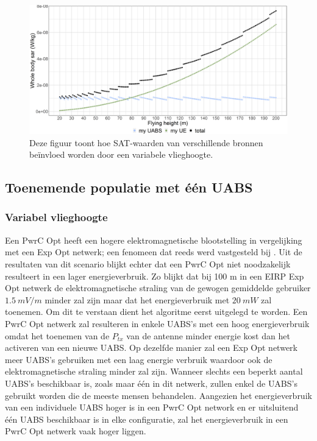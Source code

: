 \documentclass[twocolumn]{phdsymp_dutch}
\begin{document}
\begin{figure}[h!]
\centering
  \includegraphics[width=\linewidth]{s1/fhvssar.png}
  \caption{
    Deze figuur toont hoe SAT-waarden van verschillende bronnen be\"invloed worden door een variabele vlieghoogte.}
  \label{fig:s1_fhsar}
\end{figure}

\FloatBarrier
\subsection{Toenemende populatie met \'e\'en UABS}
\subsubsection{Variabel vlieghoogte}
Een \gls{PwrC Opt} heeft een hogere elektromagnetische blootstelling in vergelijking met een
 \gls{Exp Opt} netwerk; een fenomeen dat reeds werd vastgesteld bij \cite{J1}. 
Uit de resultaten van dit scenario blijkt echter dat een
\gls{PwrC Opt} niet noodzakelijk resulteert in een lager energieverbruik.
Zo blijkt dat bij 100 m in een  \gls{EIRP} \gls{Exp Opt} netwerk
 de elektromagnetische straling van de gewogen gemiddelde gebruiker
 $1.5\ mV/m$ minder zal zijn maar dat het energieverbruik met $20\ mW$ zal toenemen.
Om dit te verstaan dient het algoritme eerst uitgelegd te worden.
Een  \gls{PwrC Opt} netwerk zal resulteren in enkele \gls{UABS}'s met een hoog energieverbruik 
omdat het toenemen van de $P_{tx}$ van de antenne minder energie kost dan het activeren van een nieuwe \gls{UABS}.
Op dezelfde manier zal een \gls{Exp Opt} netwerk meer \gls{UABS}'s gebruiken met een laag energie verbruik waardoor ook de elektromagnetische straling minder zal zijn.
Wanneer slechts een beperkt aantal \gls{UABS}'s beschikbaar is, zoals maar \'e\'en in dit netwerk, 
zullen enkel de \gls{UABS}'s gebruikt worden die de meeste mensen behandelen.
Aangezien het energieverbruik van een individuele \gls{UABS} hoger is in een \gls{PwrC Opt} network en er uitsluitend 
\'e\'en \gls{UABS} beschikbaar is in elke configuratie, zal 
 het energieverbruik in een \gls{PwrC Opt} netwerk vaak hoger liggen.
\end{document}
